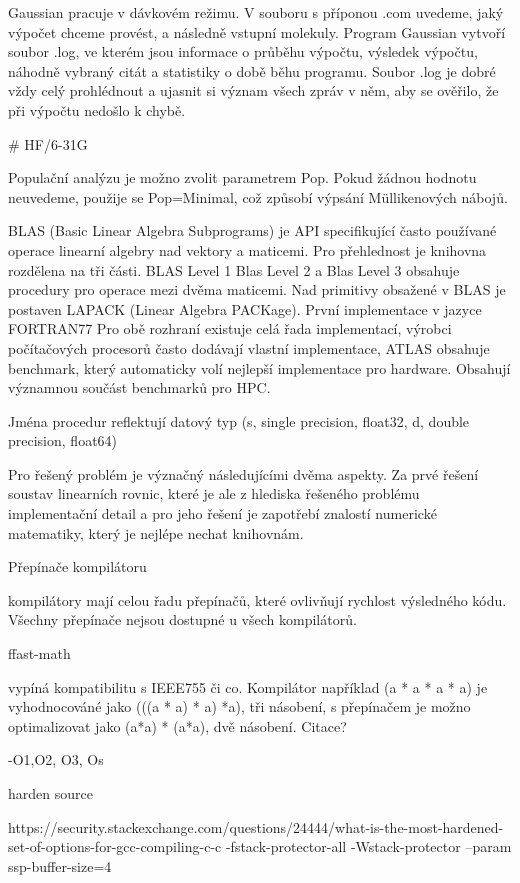 \documentclass[
  color, %
  table, %
  lof,   %
  lot,   %
]{fithesis3}
\begin{document}
Gaussian pracuje v dávkovém režimu. V souboru s příponou .com uvedeme, jaký výpočet chceme provést, a následně vstupní molekuly. Program Gaussian vytvoří soubor .log, ve kterém jsou informace o průběhu výpočtu, výsledek výpočtu, náhodně vybraný citát a statistiky o době běhu programu. Soubor .log je dobré vždy celý prohlédnout a ujasnit si význam všech zpráv v něm, aby se ověřilo, že při výpočtu nedošlo k chybě.

# HF/6-31G

Populační analýzu je možno zvolit parametrem Pop. Pokud žádnou hodnotu neuvedeme, použije se Pop=Minimal, což způsobí výpsání Müllikenových nábojů.


BLAS (Basic Linear Algebra Subprograms) je API specifikující často používané operace linearní algebry nad vektory a maticemi. Pro přehlednost je knihovna rozdělena na tři části. BLAS Level 1 Blas Level 2 a Blas Level 3 obsahuje procedury pro operace mezi dvěma maticemi. Nad primitivy obsažené v BLAS je postaven LAPACK (Linear Algebra PACKage). První implementace v jazyce FORTRAN77 Pro obě rozhraní existuje celá řada implementací, výrobci počítačových procesorů často dodávají vlastní implementace, ATLAS obsahuje benchmark, který automaticky volí nejlepší implementace pro hardware. Obsahují významnou součást benchmarků pro HPC.

Jména procedur reflektují datový typ (s, single precision, float32, d, double precision, float64)




Pro řešený problém je význačný následujícími dvěma aspekty. Za prvé řešení soustav linearních rovnic, které je ale z hlediska řešeného problému implementační detail a pro jeho řešení je zapotřebí znalostí numerické matematiky, který je nejlépe nechat knihovnám.

Přepínače kompilátoru

kompilátory mají celou řadu přepínačů, které ovlivňují rychlost výsledného kódu. Všechny přepínače nejsou dostupné u všech kompilátorů.

ffast-math

vypíná kompatibilitu s IEEE755 či co. Kompilátor například (a * a * a * a) je vyhodnocováné jako (((a * a) * a) *a), tři násobení, s přepínačem je možno optimalizovat jako (a*a) * (a*a), dvě násobení. Citace?

-O1,O2, O3, Os

harden source

https://security.stackexchange.com/questions/24444/what-is-the-most-hardened-set-of-options-for-gcc-compiling-c-c
-fstack-protector-all -Wstack-protector --param ssp-buffer-size=4 
\end{document}
